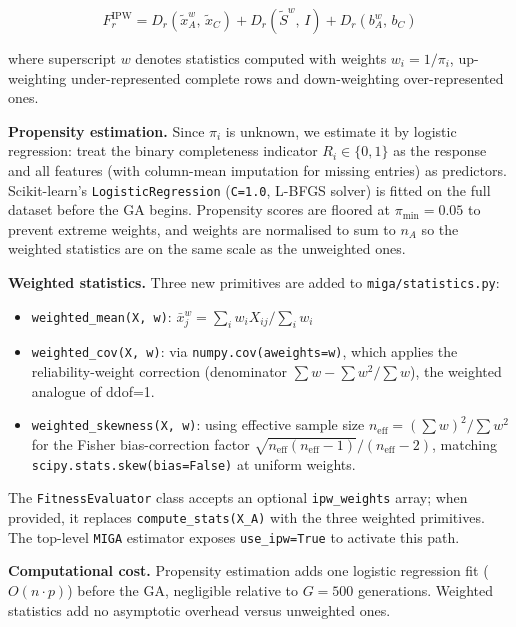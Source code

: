 \begin{equation}
    F_r^{\text{IPW}} = D_r\!\left(\tilde{x}_A^w,\, \tilde{x}_C\right) + D_r\!\left(\tilde{S}^w,\, I\right) + D_r\!\left(b_A^w,\, b_C\right)
\end{equation}

where superscript $w$ denotes statistics computed with weights $w_i = 1/\pi_i$,
up-weighting under-represented complete rows and down-weighting over-represented
ones.

\textbf{Propensity estimation.} Since $\pi_i$ is unknown, we estimate it by
logistic regression: treat the binary completeness indicator $R_i \in \{0, 1\}$
as the response and all features (with column-mean imputation for missing entries)
as predictors. Scikit-learn's \texttt{LogisticRegression} (\texttt{C=1.0},
L-BFGS solver) is fitted on the full dataset before the GA begins. Propensity
scores are floored at $\pi_{\min} = 0.05$ to prevent extreme weights, and
weights are normalised to sum to $n_A$ so the weighted statistics are on the
same scale as the unweighted ones.

\textbf{Weighted statistics.} Three new primitives are added to
\texttt{miga/statistics.py}:

\begin{itemize}
    \item \texttt{weighted\_mean(X, w)}: $\bar{x}^w_j = \sum_i w_i X_{ij} / \sum_i w_i$
    \item \texttt{weighted\_cov(X, w)}: via \texttt{numpy.cov(aweights=w)}, which
          applies the reliability-weight correction (denominator
          $\sum w - \sum w^2/\sum w$), the weighted analogue of ddof=1.
    \item \texttt{weighted\_skewness(X, w)}: using effective sample size
          $n_\text{eff} = (\sum w)^2 / \sum w^2$ for the Fisher bias-correction
          factor $\sqrt{n_\text{eff}(n_\text{eff}-1)}/(n_\text{eff}-2)$, matching
          \texttt{scipy.stats.skew(bias=False)} at uniform weights.
\end{itemize}

The \texttt{FitnessEvaluator} class accepts an optional \texttt{ipw\_weights}
array; when provided, it replaces \texttt{compute\_stats(X\_A)} with the three
weighted primitives. The top-level \texttt{MIGA} estimator exposes
\texttt{use\_ipw=True} to activate this path.

\textbf{Computational cost.} Propensity estimation adds one logistic regression
fit ($O(n \cdot p)$) before the GA, negligible relative to $G=500$ generations.
Weighted statistics add no asymptotic overhead versus unweighted ones.

